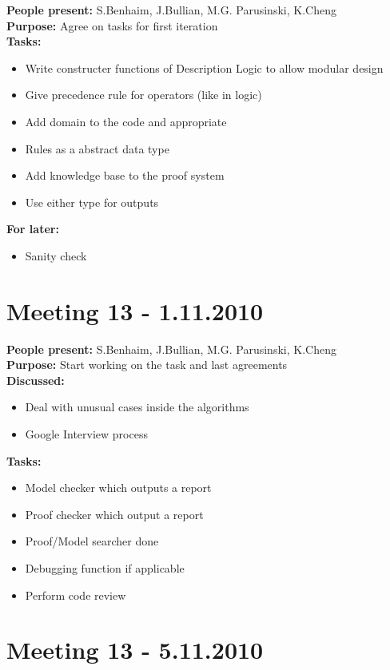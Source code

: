 \documentclass[12pt]{article}
\begin{document}
\textbf{People present:} S.Benhaim, J.Bullian, M.G. Parusinski, K.Cheng \\
\textbf{Purpose:} Agree on tasks for first iteration \\
\textbf{Tasks:} \\ 
\begin{itemize}
\item Write constructer functions of Description Logic to allow modular design
\item Give precedence rule for operators (like in logic)
\item Add domain to the code and appropriate
\item Rules as a abstract data type
\item Add knowledge base to the proof system
\item Use either type for outputs
\end{itemize}
\textbf{For later:}
\begin{itemize}
\item Sanity check
\end{itemize}

\section*{Meeting 13 - 1.11.2010}

\textbf{People present:} S.Benhaim, J.Bullian, M.G. Parusinski, K.Cheng \\
\textbf{Purpose:} Start working on the task and last agreements \\
\textbf{Discussed:}
\begin{itemize}
\item Deal with unusual cases inside the algorithms
\item Google Interview process
\end{itemize}
\textbf{Tasks:}
\begin{itemize}
\item Model checker which outputs a report
\item Proof checker which output a report
\item Proof/Model searcher done
\item Debugging function if applicable
\item Perform code review
\end{itemize}

\section*{Meeting 13 - 5.11.2010}
\end{document}
